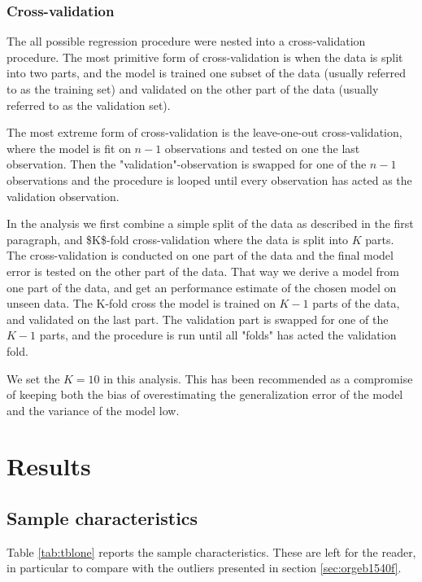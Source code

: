 \documentclass[11pt]{article}
\begin{document}
\subsubsection{Cross-validation}
\label{sec:org205d860}

The all possible regression procedure were nested into a cross-validation procedure. The most 
primitive form of cross-validation is when the data is split into two parts, and the model
is trained one subset of the data (usually referred to as the training set) and validated 
on the other part of the data (usually referred to as the validation set).

The most extreme form of cross-validation is the leave-one-out cross-validation, where the model 
is fit on \(n - 1\) observations and tested on one the last observation. Then the "validation"-observation 
is swapped for one of the \(n - 1\) observations and the procedure is looped until every observation has acted 
as the validation observation.

In the analysis we first combine a simple split of the data as described in the first paragraph, and 
\$K\$-fold cross-validation where the data is split into \(K\) parts. The cross-validation is conducted on
one part of the data and the final model error is tested on the other 
part of the data. That way we derive a model from one part of the data, and get an performance 
estimate of the chosen model on unseen data. The K-fold cross the model is trained on \(K - 1\) parts of the data,
and validated on the last part. The validation part is swapped for one of the \(K - 1\) parts, and the
procedure is run until all "folds" has acted the validation fold.

We set the \(K = 10\) in this analysis. This has been recommended as a compromise of keeping both the bias of 
overestimating the generalization error of the model and the variance of the model low.
\cite{hastie2009elements}

\newpage
\section{Results}
\label{sec:orgea46f36}
\subsection{Sample characteristics}
\label{sec:org4a5de4e}

Table \ref{tab:tblone} reports the sample characteristics. These are left for the reader, in particular to
compare with the outliers presented in section \ref{sec:orgeb1540f}.
\end{document}
